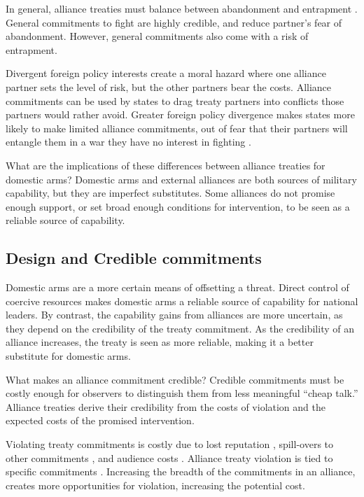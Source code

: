 \documentclass[12pt]{article}
\begin{document}
In general, alliance treaties must balance between abandonment and entrapment \citep{Snyder1984, Benson2012}. General commitments to fight are highly credible, and reduce partner's fear of abandonment. However, general commitments also come with a risk of entrapment. 

Divergent foreign policy interests create a moral hazard where one alliance partner sets the level of risk, but the other partners bear the costs. Alliance commitments can be used by states to drag treaty partners into conflicts those partners would rather avoid. Greater foreign policy divergence makes states more likely to make limited alliance commitments, out of fear that their partners will entangle them in a war they have no interest in fighting \citep{Benson2012}. 

What are the implications of these differences between alliance treaties for domestic arms? Domestic arms and external alliances are both sources of military capability, but they are imperfect substitutes. Some alliances do not promise enough support, or set broad enough conditions for intervention, to be seen as a reliable source of capability. 



\subsection*{Design and Credible commitments}

Domestic arms are a more certain means of offsetting a threat. Direct control of coercive resources makes domestic arms a reliable source of capability for national leaders. By contrast, the capability gains from alliances are more uncertain, as they depend on the credibility of the treaty commitment. As the credibility of an alliance increases, the treaty is seen as more reliable, making it a better substitute for domestic arms. 

What makes an alliance commitment credible? Credible commitments must be costly enough for observers to distinguish them from less meaningful ``cheap talk.'' Alliance treaties derive their credibility from the costs of violation and the expected costs of the promised intervention. 

Violating treaty commitments is costly due to lost reputation \citep{Gibler2008}, spill-overs to other commitments \citep{Crescenzi2012}, and audience costs \citep{Fearon1997, Tomz2007ar, Chibaetal2015, Levyetal2015}. Alliance treaty violation is tied to specific commitments \citep{Leedsetal2000}. Increasing the breadth of the commitments in an alliance, creates more opportunities for violation, increasing the potential cost. 
\end{document}
